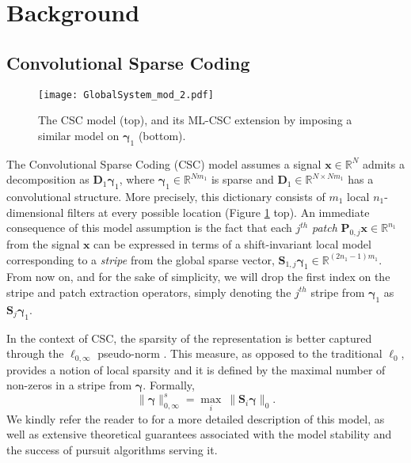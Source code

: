 \documentclass[10pt,journal]{IEEEtran}
\def\x{{\mathbf x}}
\def\D{{\mathbf D}}
\def\gama{{\boldsymbol \gamma}}
\def\Loi{{\ell_{0,\infty}}}
\theoremstyle{plain}
\theoremstyle{definition}
\begin{document}

\section{Background}
\label{sec:Background}

\subsection{Convolutional Sparse Coding}

\begin{figure}
\begin{center}
	\texttt{[image: GlobalSystem\_mod\_2.pdf]}
	\caption{The CSC model (top), and its ML-CSC extension by imposing a similar model on $\gama_1$ (bottom). %
	}
	\label{Fig:ML-CSCmodel}
\end{center}
\end{figure}

The Convolutional Sparse Coding (CSC) model assumes a signal $\x \in \mathbb{R}^N$ admits a decomposition as $\D_1\gama_1$, where $\gama_1 \in \mathbb{R}^{Nm_1}$ is sparse and $\D_1 \in \mathbb{R}^{N\times Nm_1}$ has a convolutional structure. More precisely, this dictionary consists of $m_1$ local $n_1$-dimensional filters at every possible location (Figure \ref{Fig:ML-CSCmodel} top).
An immediate consequence of this model assumption is the fact that each $j^{th}$ \emph{patch} $\mathbf{P}_{0,j}\x \in \mathbb{R}^{n_1}$ from the signal $\x$ can be expressed in terms of a shift-invariant local model corresponding to a \emph{stripe} from the global sparse vector, $\mathbf{S}_{1,j}\gama_1 \in \mathbb{R}^{(2n_1-1)m_1}$. From now on, and for the sake of simplicity, we will drop the first index on the stripe and patch extraction operators, simply denoting the $j^{th}$ stripe from $\gama_1$ as $\mathbf{S}_j\gama_1$. 

In the context of CSC, the sparsity of the representation is better captured through the $\Loi$ pseudo-norm \cite{WorkingLocallyThinkingGlobally}. This measure, as opposed to the traditional $\ell_0$, provides a notion of local sparsity and it is defined by the maximal number of non-zeros in a stripe from $\gama$. Formally,
\begin{equation}
	\|\gama\|^s_{0,\infty} = \underset{i}{\max}\ \| \mathbf{S}_i \gama \|_0.
\end{equation}
We kindly refer the reader to \cite{WorkingLocallyThinkingGlobally} for a more detailed description of this model, as well as extensive theoretical guarantees associated with the model stability and the success of pursuit algorithms serving it. 
\end{document}
